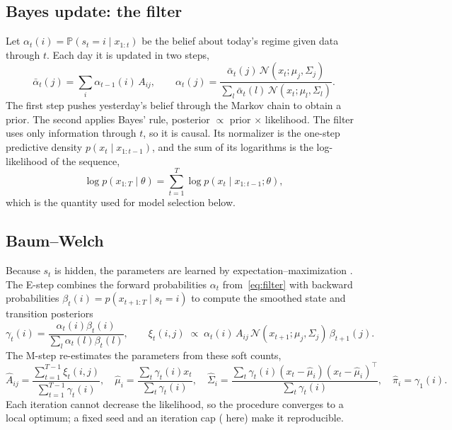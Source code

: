 \documentclass[11pt]{article}
\newcommand{\pr}{\mathbb{P}}
\begin{document}
\subsection{Bayes update: the filter}

Let $\alpha_t(i)=\pr(s_t=i\mid x_{1:t})$ be the belief about today's regime given data through $t$. Each day it is updated in two steps,
\begin{equation}
\bar\alpha_t(j)=\sum_{i}\alpha_{t-1}(i)\,A_{ij},
\qquad
\alpha_t(j)=\frac{\bar\alpha_t(j)\,\mathcal N(x_t;\mu_j,\Sigma_j)}{\sum_{l}\bar\alpha_t(l)\,\mathcal N(x_t;\mu_l,\Sigma_l)}.
\label{eq:filter}
\end{equation}
The first step pushes yesterday's belief through the Markov chain to obtain a prior. The second applies Bayes' rule, posterior $\propto$ prior $\times$ likelihood. The filter uses only information through $t$, so it is causal. Its normalizer is the one-step predictive density $p(x_t\mid x_{1:t-1})$, and the sum of its logarithms is the log-likelihood of the sequence,
\begin{equation}
\log p(x_{1:T}\mid\theta)=\sum_{t=1}^{T}\log p(x_t\mid x_{1:t-1};\theta),
\label{eq:loglik}
\end{equation}
which is the quantity used for model selection below.

\subsection{Baum--Welch}

Because $s_t$ is hidden, the parameters are learned by expectation--maximization \cite{baum1970,dempster1977,rabiner1989}. The E-step combines the forward probabilities $\alpha_t$ from~\eqref{eq:filter} with backward probabilities $\beta_t(i)=p(x_{t+1:T}\mid s_t=i)$ to compute the smoothed state and transition posteriors
\begin{equation}
\gamma_t(i)=\frac{\alpha_t(i)\beta_t(i)}{\sum_{l}\alpha_t(l)\beta_t(l)},
\qquad
\xi_t(i,j)\;\propto\;\alpha_t(i)\,A_{ij}\,\mathcal N(x_{t+1};\mu_j,\Sigma_j)\,\beta_{t+1}(j).
\end{equation}
The M-step re-estimates the parameters from these soft counts,
\begin{equation}
\hat A_{ij}=\frac{\sum_{t=1}^{T-1}\xi_t(i,j)}{\sum_{t=1}^{T-1}\gamma_t(i)},\quad
\hat\mu_i=\frac{\sum_t\gamma_t(i)x_t}{\sum_t\gamma_t(i)},\quad
\hat\Sigma_i=\frac{\sum_t\gamma_t(i)(x_t-\hat\mu_i)(x_t-\hat\mu_i)^{\top}}{\sum_t\gamma_t(i)},\quad
\hat\pi_i=\gamma_1(i).
\end{equation}
Each iteration cannot decrease the likelihood, so the procedure converges to a local optimum; a fixed seed and an iteration cap (\HMMIterations{} here) make it reproducible.
\end{document}
